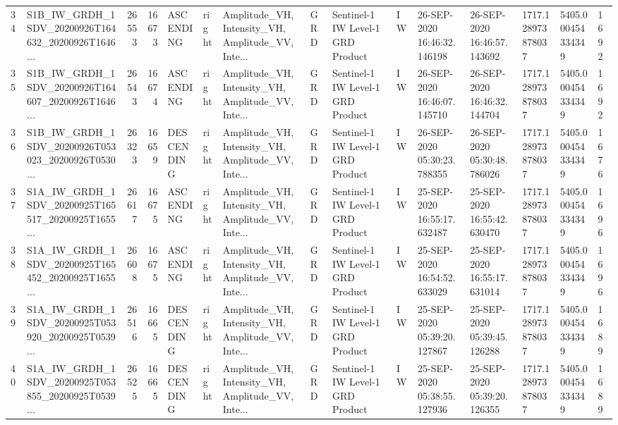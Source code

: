 \begin{tabular}{llrrlllllllllll}
34  &  S1B\_IW\_GRDH\_1SDV\_20200926T164632\_20200926T1646... &  26553 &   16673 &   ASCENDING &  right &  Amplitude\_VH, Intensity\_VH, Amplitude\_VV, Inte... &          GRD &  Sentinel-1 IW Level-1 GRD Product &              IW &  26-SEP-2020 16:46:32.146198 &  26-SEP-2020 16:46:57.143692 &          1717.128973878037 &  5405.000454334349 &       1692 \\
35  &  S1B\_IW\_GRDH\_1SDV\_20200926T164607\_20200926T1646... &  26543 &   16674 &   ASCENDING &  right &  Amplitude\_VH, Intensity\_VH, Amplitude\_VV, Inte... &          GRD &  Sentinel-1 IW Level-1 GRD Product &              IW &  26-SEP-2020 16:46:07.145710 &  26-SEP-2020 16:46:32.144704 &          1717.128973878037 &  5405.000454334349 &       1692 \\
36  &  S1B\_IW\_GRDH\_1SDV\_20200926T053023\_20200926T0530... &  26323 &   16659 &  DESCENDING &  right &  Amplitude\_VH, Intensity\_VH, Amplitude\_VV, Inte... &          GRD &  Sentinel-1 IW Level-1 GRD Product &              IW &  26-SEP-2020 05:30:23.788355 &  26-SEP-2020 05:30:48.786026 &          1717.128973878037 &  5405.000454334349 &       1676 \\
37  &  S1A\_IW\_GRDH\_1SDV\_20200925T165517\_20200925T1655... &  26617 &   16675 &   ASCENDING &  right &  Amplitude\_VH, Intensity\_VH, Amplitude\_VV, Inte... &          GRD &  Sentinel-1 IW Level-1 GRD Product &              IW &  25-SEP-2020 16:55:17.632487 &  25-SEP-2020 16:55:42.630470 &          1717.128973878037 &  5405.000454334349 &       1696 \\
38  &  S1A\_IW\_GRDH\_1SDV\_20200925T165452\_20200925T1655... &  26608 &   16675 &   ASCENDING &  right &  Amplitude\_VH, Intensity\_VH, Amplitude\_VV, Inte... &          GRD &  Sentinel-1 IW Level-1 GRD Product &              IW &  25-SEP-2020 16:54:52.633029 &  25-SEP-2020 16:55:17.631014 &          1717.128973878037 &  5405.000454334349 &       1696 \\
39  &  S1A\_IW\_GRDH\_1SDV\_20200925T053920\_20200925T0539... &  26516 &   16665 &  DESCENDING &  right &  Amplitude\_VH, Intensity\_VH, Amplitude\_VV, Inte... &          GRD &  Sentinel-1 IW Level-1 GRD Product &              IW &  25-SEP-2020 05:39:20.127867 &  25-SEP-2020 05:39:45.126288 &          1717.128973878037 &  5405.000454334349 &       1689 \\
40  &  S1A\_IW\_GRDH\_1SDV\_20200925T053855\_20200925T0539... &  26525 &   16665 &  DESCENDING &  right &  Amplitude\_VH, Intensity\_VH, Amplitude\_VV, Inte... &          GRD &  Sentinel-1 IW Level-1 GRD Product &              IW &  25-SEP-2020 05:38:55.127936 &  25-SEP-2020 05:39:20.126355 &          1717.128973878037 &  5405.000454334349 &       1689 \\

\end{tabular}
